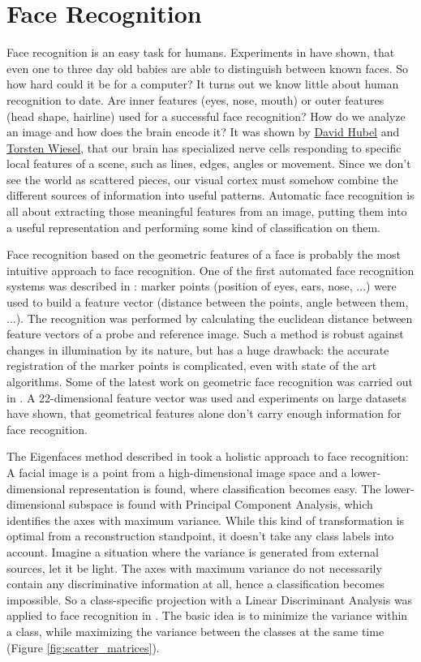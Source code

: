 \section{Face Recognition}

Face recognition is an easy task for humans. Experiments in \cite{Tu06} have shown, that even one to three day old babies are able to distinguish between known faces. So how hard could it be for a computer? It turns out we know little about human recognition to date. Are inner features (eyes, nose, mouth) or outer features (head shape, hairline) used for a successful face recognition? How do we analyze an image and how does the brain encode it? It was shown by \href{http://en.wikipedia.org/wiki/David_H._Hubel}{David Hubel} and \href{http://en.wikipedia.org/wiki/Torsten_Wiesel}{Torsten Wiesel}, that our brain has specialized nerve cells responding to specific local features of a scene, such as lines, edges, angles or movement. Since we don't see the world as scattered pieces, our visual cortex must somehow combine the different sources of information into useful patterns. Automatic face recognition is all about extracting those meaningful features from an image, putting them into a useful representation and performing some kind of classification on them.

Face recognition based on the geometric features of a face is probably the most intuitive approach to face recognition. One of the first automated face recognition systems was described in \cite{Kanade73}: marker points (position of eyes, ears, nose, ...) were used to build a feature vector (distance between the points, angle between them, ...). The recognition was performed by calculating the euclidean distance between feature vectors of a probe and reference image. Such a method is robust against changes in illumination by its nature, but has a huge drawback: the accurate registration of the marker points is complicated, even with state of the art algorithms. Some of the latest work on geometric face recognition was carried out in \cite{Bru92}. A 22-dimensional feature vector was used and experiments on large datasets have shown, that geometrical features alone don't carry enough information for face recognition.

The Eigenfaces method described in \cite{PT91} took a holistic approach to face recognition: A facial image is a point from a high-dimensional image space and a lower-dimensional representation is found, where classification becomes easy. The lower-dimensional subspace is found with Principal Component Analysis, which identifies the axes with maximum variance. While this kind of transformation is optimal from a reconstruction standpoint, it doesn't take any class labels into account. Imagine a situation where the variance is generated from external sources, let it be light. The axes with maximum variance do not necessarily contain any discriminative information at all, hence a classification becomes impossible. So a class-specific projection with a Linear Discriminant Analysis was applied to face recognition in \cite{belhumeru97}. The basic idea is to minimize the variance within a class, while maximizing the variance between the classes at the same time (Figure \ref{fig:scatter_matrices}). 

